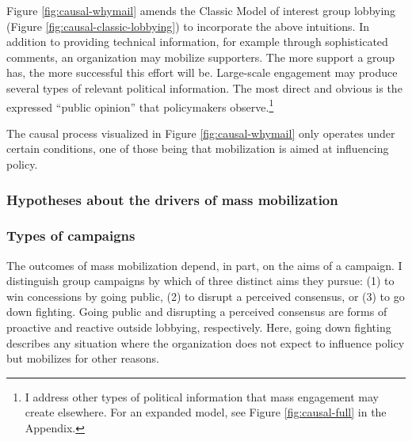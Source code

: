 

Figure \ref{fig:causal-whymail} amends the Classic Model of interest group lobbying (Figure \ref{fig:causal-classic-lobbying}) to incorporate the above intuitions. In addition to providing technical information, for example through sophisticated comments, an organization may mobilize supporters. The more support a group has, the more successful this effort will be. Large-scale engagement may produce several types of relevant political information. The most direct and obvious is the expressed ``public opinion'' that policymakers observe.\footnote{I address other types of political information that mass engagement may create elsewhere. For an expanded model, see Figure \ref{fig:causal-full} in the Appendix.}

The causal process visualized in Figure \ref{fig:causal-whymail} only operates under certain conditions, one of those being that mobilization is aimed at influencing policy. 




\subsubsection{Hypotheses about the drivers of mass mobilization}

\subsubsection{Types of campaigns} The outcomes of mass mobilization depend, in part, on the aims of a campaign. I distinguish group campaigns by which of three distinct aims they pursue: (1) to win concessions by going public, (2) to disrupt a perceived consensus, or (3) to go down fighting. Going public and disrupting a perceived consensus are forms of proactive and reactive outside lobbying, respectively. Here, going down fighting describes any situation where the organization does not expect to influence policy but mobilizes for other reasons. 

